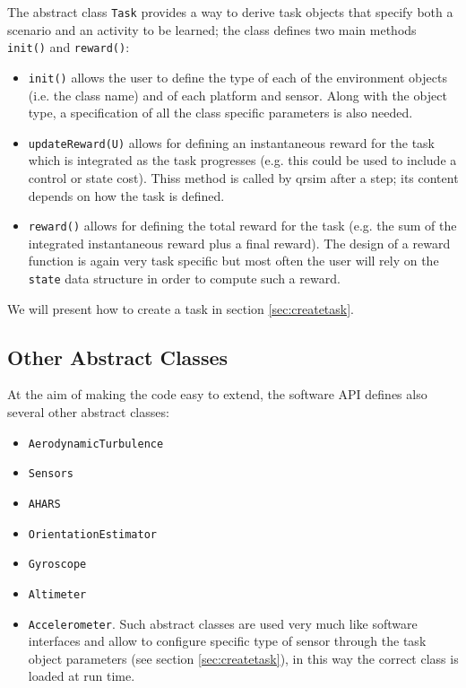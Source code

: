 \documentclass[a4paper,11pt]{report}
\begin{document}
The abstract class \texttt{Task} provides a way to derive task objects that specify both a scenario and an activity to be learned; the class defines two main methods \texttt{init()} and \texttt{reward()}:
\begin{itemize}
 \item \texttt{init()} allows the user to define the type of each of the environment objects (i.e. the class name) and of each platform and sensor. Along with the object type, a specification of all the class specific parameters is also needed.
 \item \texttt{updateReward(U)} allows for defining an instantaneous reward for the task which is integrated as the task progresses (e.g. this could be used to include a control or state cost). Thiss method is called by qrsim after a step; its content depends on how the task is defined.
 \item \texttt{reward()} allows for defining the total reward for the task (e.g. the sum of the integrated instantaneous reward plus a final reward). The design of a reward function is again very task specific but most often the user will rely on the \texttt{state} data structure in order to compute such a reward. 
\end{itemize}

We will present how to create a task in section \ref{sec:createtask}.

\subsection{Other Abstract Classes}

At the aim of making the code easy to extend, the software API defines also several other abstract classes:
\begin{itemize}
\item \texttt{AerodynamicTurbulence}
\item \texttt{Sensors}
\item \texttt{AHARS}
\item \texttt{OrientationEstimator}
\item \texttt{Gyroscope}
\item \texttt{Altimeter}
\item \texttt{Accelerometer}.
Such abstract classes are used very much like software interfaces and allow to configure specific type of sensor through the task object parameters (see section \ref{sec:createtask}), in this way the correct class is loaded at run time.
\end{itemize}
\end{document}
